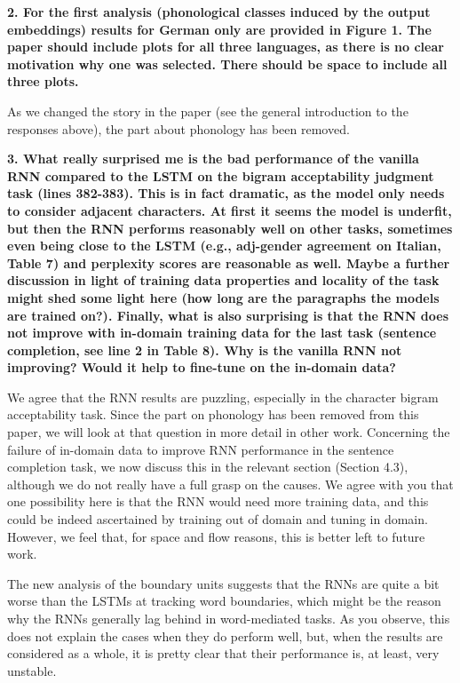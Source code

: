 \documentclass{article}
\begin{document}
\textbf{2. For the first analysis (phonological classes induced by the output embeddings) results for German only are provided in Figure 1. The paper should include plots for all three languages, as there is no clear motivation why one was selected. There should be space to include all three plots.}

As we changed the story in the paper (see the general introduction to the responses above), the part about phonology has been removed.
\newline

\textbf{3. What really surprised me is the bad performance of the vanilla RNN compared to the LSTM on the bigram acceptability judgment task (lines 382-383). This is in fact dramatic, as the model only needs to consider adjacent characters. At first it seems the model is underfit, but then the RNN performs reasonably well on other tasks, sometimes even being close to the LSTM (e.g., adj-gender agreement on Italian, Table 7) and perplexity scores are reasonable as well. Maybe a further discussion in light of training data properties and locality of the task might shed some light here (how long are the paragraphs the models are trained on?). Finally, what is also surprising is that the RNN does not improve with in-domain training data for the last task (sentence completion, see line 2 in Table 8). Why is the vanilla RNN not improving? Would it help to fine-tune on the in-domain data?}

We agree that the RNN results are puzzling, especially in the character bigram acceptability task. Since the part on phonology has been removed from this paper, we will look at that question in more detail in other work. Concerning the failure of in-domain data to improve RNN performance in the sentence completion task, we now discuss this in the relevant section (Section 4.3), although we do not really have a full grasp on the causes. We agree with you that one possibility here is that the RNN would need more training data, and this could be indeed ascertained by training out of domain and tuning in domain. However, we feel that, for space and flow reasons, this is better left to future work.

The new analysis of the boundary units suggests that the RNNs are quite a bit worse than the LSTMs at tracking word boundaries, which might be the reason why the RNNs generally lag behind in word-mediated tasks. As you observe, this does not explain the cases when they do perform well, but, when the results are considered as a whole, it is pretty clear that their performance is, at least, very unstable.
\end{document}
